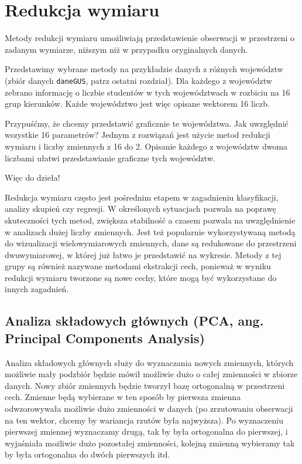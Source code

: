 \documentclass[polish,]{book}
\begin{document}
\hypertarget{part_2}{%
\chapter{Redukcja wymiaru}\label{part_2}}

Metody redukcji wymiaru umożliwiają przedstawienie obserwacji w przestrzeni o
zadanym wymiarze, niższym niż w przypadku oryginalnych danych.

Przedstawimy wybrane metody na przykładzie danych z różnych województw
(zbiór danych \texttt{daneGUS}, patrz ostatni rozdział). Dla każdego z województw zebrano informację o liczbie studentów w tych województwach w rozbiciu na 16 grup
kierunków. Każde województwo jest więc opisane wektorem 16 liczb.

Przypuśćmy, że chcemy przedstawić graficznie te województwa. Jak uwzględnić
wszystkie 16 parametrów? Jednym z rozwiązań jest użycie metod redukcji wymiaru i
liczby zmiennych z 16 do 2. Opisanie każdego z województw dwoma liczbami ułatwi
przedstawianie graficzne tych województw.

Więc do dzieła!

Redukcja wymiaru często jest pośrednim etapem w zagadnieniu klasyfikacji, analizy skupień czy regresji. W określonych sytuacjach pozwala na poprawę skuteczności
tych metod, zwiększa stabilność a czasem pozwala na uwzględnienie w analizach dużej liczby zmiennych. Jest też popularnie wykorzystywaną metodą do wizualizacji
wielowymiarowych zmiennych, dane są redukowane do przestrzeni dwuwymiarowej,
w której już łatwo je przedstawić na wykresie. Metody z tej grupy są również nazywane metodami ekstrakcji cech, ponieważ w wyniku redukcji wymiaru tworzone są
nowe cechy, które mogą być wykorzystane do innych zagadnień.

\hypertarget{part_21}{%
\section{Analiza składowych głównych (PCA, ang. Principal Components Analysis)}\label{part_21}}

Analiza składowych głównych służy do wyznaczania nowych zmiennych, których
możliwie mały podzbiór będzie mówił możliwie dużo o całej zmienności w zbiorze
danych. Nowy zbiór zmiennych będzie tworzył bazę ortogonalną w przestrzeni cech.
Zmienne będą wybierane w ten sposób by pierwsza zmienna odwzorowywała możliwie dużo zmienności w danych (po zrzutowaniu obserwacji na ten wektor, chcemy by
wariancja rzutów była najwyższa). Po wyznaczeniu pierwszej zmiennej wyznaczamy
drugą, tak by była ortogonalna do pierwszej, i wyjaśniała możliwie dużo pozostałej
zmienności, kolejną zmienną wybieramy tak by była ortogonalna do dwóch pierwszych itd.
\end{document}
